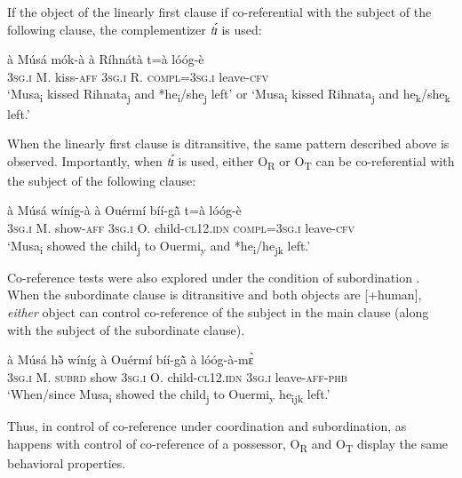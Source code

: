 \documentclass[output=paper]{langsci/langscibook}
\begin{document}
If the object of the linearly first clause if co-referential with the subject of the following clause, the complementizer \textit{tɪ́} is used:

\ea
\label{ex:38.pacchiarotti}
\gll à    Músá  mók-à    à    Ríhnátà  t=à        lóóg-è\\
\textsc{3sg.i}    M.  kiss-\textsc{aff}  \textsc{3sg.i}    R.    \textsc{compl=3sg.i}      leave-\textsc{cfv}\\
\glt `Musa\textsubscript{i} kissed Rihnata\textsubscript{j} and *he\textsubscript{i}/she\textsubscript{j} left' or `Musa\textsubscript{i} kissed Rihnata\textsubscript{j} and he\textsubscript{k}/she\textsubscript{k} left.'
\z

When the linearly first clause is ditransitive, the same pattern described above is observed. Importantly, when \textit{tɪ́} is used, either O\textsubscript{R} or O\textsubscript{T} can be co-referential with the subject of the following clause:

\ea
\label{ex:39.pacchiarotti}
\gll à    Músá  wíníg-à  à    Ouérmí  bíí-g\`{ã}  t=à      lóóg-è \\     
\textsc{3sg.i}    M.  show-\textsc{aff}  \textsc{3sg.i}    O.    child-\textsc{cl12.idn} \textsc{  compl=3sg.i}        leave-\textsc{cfv}\\
\glt `Musa\textsubscript{i}  showed the child\textsubscript{j} to Ouermi\textsubscript{y} and *he\textsubscript{i}/he\textsubscript{jk} left.'
\z

Co-reference tests were also explored under the condition of subordination . When the subordinate clause is ditransitive and both objects are [+human], \textit{either} object can control co-reference of the subject in the main clause (along with the subject of the subordinate clause).

\ea
\label{ex:40.pacchiarotti}
\gll à Músá hə̃̀ wíníg à Ouérmí bíí-g\`{ã} à lóóg-à-mɛ̀\\
\textsc{3sg.i}    M.  \textsc{subrd}    show  \textsc{3sg.i}    O.        child-\textsc{cl12.idn} \textsc{3sg.i}    leave-\textsc{aff-phb}\\
\glt `When/since Musa\textsubscript{i} showed the child\textsubscript{j} to Ouermi\textsubscript{y} he\textsubscript{ijk} left.'
\z

Thus, in control of co-reference under coordination and subordination, as happens with control of co-reference of a possessor, O\textsubscript{R} and O\textsubscript{T} display the same behavioral properties. 
\end{document}
